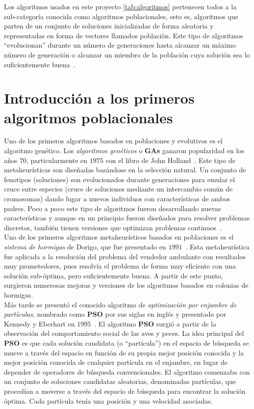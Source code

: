 Los algoritmos usados en este proyecto \ref{tab:algoritmos} pertenecen todos a la sub-categoría conocida como algoritmos poblacionales, esto es, algoritmos que parten de un conjunto de soluciones inicializadas de forma aleatoria y representadas en forma de vectores llamados población. Este tipo de algoritmos ``evolucionan'' durante un número de generaciones hasta alcanzar un máximo número de generación o alcanzar un miembro de la población cuya solución sea lo suficientemente buena~\cite{simon2013evolutionary}.

\section{Introducción a los primeros algoritmos poblacionales}

Uno de los primeros algoritmos basados en poblaciones y evolutivos es el algoritmo genético. Los \textit{algoritmos genéticos} o \textbf{GAs} ganaron popularidad en los años $70$, particularmente en $1975$ con el libro de John Holland~\cite{Holland:1975}. Este tipo de metaheurísticas son diseñadas basándose en la selección natural. Un conjunto de fenotipos (soluciones) son evolucionados durante generaciones para emular el cruce entre especies (cruce de soluciones mediante un intercambio común de cromosomas) dando lugar a nuevos individuos con características de ambos padres. Poco a poco este tipo de algoritmos fueron desarrollando nuevas características y aunque en un principio fueron diseñados para resolver problemas discretos, también tienen versiones que optimizan problemas continuos~\cite{eiben2015}.\\[6pt]
Uno de los primeros algoritmos metaheurísticos basados en poblaciones es el \textit{sistema de hormigas} de Dorigo, que fue presentado en $1991$~\cite{as}. Esta metaheurística fue aplicada a la resolución del problema del vendedor ambulante con resultados muy prometedores, pues resolvía el problema de forma muy eficiente con una solución sub-óptima, pero suficientemente buena. A partir de este punto, surgieron numerosas mejoras y versiones de los algoritmos basados en colonias de hormigas.\\[6pt]
Más tarde se presentó el conocido algoritmo de \textit{optimización por enjambre de partículas}, nombrado como \textbf{PSO} por sus siglas en inglés y presentado por Kennedy y Eberhart en $1995$~\cite{kennedy_particle_1995}. El algoritmo \textbf{PSO} surgió a partir de la observación del comportamiento social de las aves y peces. La idea principal del \textbf{PSO} es que cada solución candidata (o ``partícula'') en el espacio de búsqueda se mueve a través del espacio en función de su propia mejor posición conocida y la mejor posición conocida de cualquier partícula en el enjambre, en lugar de depender de operadores de búsqueda convencionales. El algoritmo comenzaba con un conjunto de soluciones candidatas aleatorias, denominadas partículas, que procedían a moverse a través del espacio de búsqueda para encontrar la solución óptima. Cada partícula tenía una posición y una velocidad asociadas.\\[6pt]
